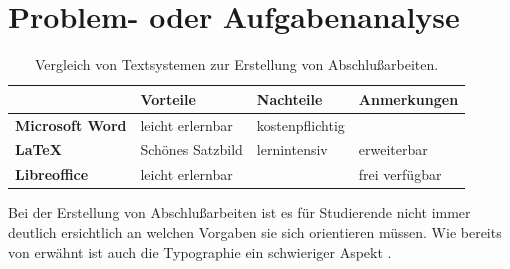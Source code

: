 \documentclass[11pt,        %
  english,ngerman,          %
  paper=a4,                 %
  captions=tablesignature,  %
  listof=numbered,          %
  bibliography=totoc,       %
  headings=small,           %
  headinclude=false,        %
  footinclude=false,        %
  parskip=half-,            %
  oneside,                  %
  BCOR=15mm,                 %
  DIV=12                    %
  ]{scrbook}                %
\begin{document}
\section{Problem- oder Aufgabenanalyse}\label{sec:problem_ana}


\begin{table}[ht]
  \renewcommand{\tabcolsep}{3mm}
  \renewcommand{\arraystretch}{1.5}
  \begin{center}
    \begin{tabular}{llll}
                              & \textbf{Vorteile}  & \textbf{Nachteile} & \textbf{Anmerkungen}\\
      \hline
      \textbf{Microsoft Word} & leicht erlernbar   & kostenpflichtig    & \\
      \textbf{\LaTeX}         & Schönes Satzbild   & lernintensiv       & erweiterbar \\
      \textbf{Libreoffice}    & leicht erlernbar   &                    & frei verfügbar \\
    \end{tabular}
    \caption{Vergleich von Textsystemen zur Erstellung von Abschlußarbeiten.}
    \label{table:typesetting}
  \end{center}
\end{table}%

Bei der Erstellung von Abschlußarbeiten ist es für Studierende nicht immer deutlich ersichtlich
an welchen Vorgaben sie sich orientieren müssen. Wie bereits von \citet[Seite 19]{bringhurst-2005-elements_typographic_style} erwähnt ist auch die Typographie ein schwieriger Aspekt \citep{willberg-2008-wegweiser_schrift}.
\end{document}
